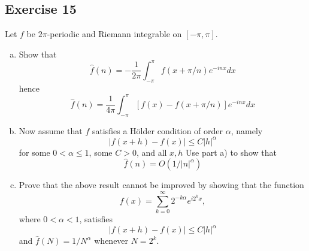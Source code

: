 \documentclass[12pt]{article}
\begin{document}
\subsection*{Exercise 15}
Let $f$ be $2\pi$-periodic and Riemann integrable on $[-\pi,\pi]$.
\begin{enumerate}[(a)]
    \item Show that
    \begin{equation*}
        \hat{f}(n)=-\frac{1}{2\pi}\int_{-\pi}^{\pi}f(x+\pi/n)e^{-inx}dx
    \end{equation*}
    hence
    \begin{equation*}
        \hat{f}(n)=\frac{1}{4\pi}\int_{-\pi}^{\pi}[f(x) - f(x + \pi/n)]e^{-inx}dx
    \end{equation*}
    \item Now assume that $f$ satisfies a Hölder condition of order $\alpha$, namely
    \begin{equation*}
        |f(x+h)-f(x)|\le C|h|^\alpha
    \end{equation*}
    for some $0<\alpha\le1$, some $C>0$, and all $x,h$ Use part a) to show that
    \begin{equation*}
        \hat{f}(n)=O(1/|n|^\alpha)
    \end{equation*}
    \item Prove that the above result cannot be improved by showing that the function
    \begin{equation*}
        f(x)=\sum_{k=0}^{\infty}2^{-k\alpha}e^{i2^kx},
    \end{equation*}
    where $0<\alpha<1$, satisfies
    \begin{equation*}
        |f(x+h)-f(x)|\le C|h|^\alpha
    \end{equation*}
    and $\hat{f}(N)=1/N^\alpha$ whenever $N=2^k$.
\end{enumerate}
\end{document}
